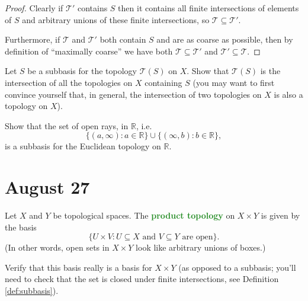 \documentclass[11pt]{scrartcl}
\providecommand{\RR}{\mathbb R}
\providecommand{\vocab}[1]{{\textbf{\textcolor{ForestGreen}{#1}}}}
\begin{document}
\begin{proof}
    Clearly if $\mathcal T'$ contains $S$ then it contains
    all finite intersections of elements of $S$ and
    arbitrary unions of these finite intersections,
    so $\mathcal T\subseteq\mathcal T'$.

    Furthermore, if $\mathcal T$ and $\mathcal T'$ both contain $S$
    and are as coarse as possible, then by definition of ``maximally coarse''
    we have both
    $\mathcal T\subseteq\mathcal T'$ and $\mathcal T'\subseteq\mathcal T$.
\end{proof}

\begin{exercise}
    Let $S$ be a subbasis for the topology $\mathcal T(S)$ on $X$.
    Show that $\mathcal T(S)$ is the intersection
    of all the topologies on $X$ containing $S$
    (you may want to first convince yourself that, in general,
    the intersection of two topologies on $X$ is also a topology on $X$).
\end{exercise}

\begin{exercise}
    Show that the set of open rays, in $\RR$, i.e.
    \begin{equation*}
	\{(a,\infty) : a\in\RR\}\cup\{(\infty,b) : b\in\RR\},
    \end{equation*}
    is a subbasis for the Euclidean topology on $\RR$.
\end{exercise}

\section{August 27}\label{sec:aug27}
\begin{definition}
    \label{def:finiteprodtop}
    Let $X$ and $Y$ be topological spaces.
    The \vocab{product topology} on $X\times Y$ is given by the basis
    \begin{equation*}
	\{U\times V : U\subseteq X\text{ and }V\subseteq Y\text{ are open}\}.
    \end{equation*}
    (In other words, open sets in $X\times Y$ look like
    arbitrary unions of boxes.)
\end{definition}

\begin{exercise}
    Verify that this basis really is a basis for $X\times Y$
    (as opposed to a subbasis; you'll need to check that the set is
    closed under finite intersections, see Definition \ref{def:subbasis}).
\end{exercise}
\end{document}
